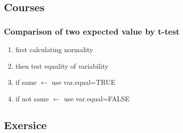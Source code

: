 \subsection{Courses}
\lstset{language=R}

\subsubsection{Comparison of two expected value by t-test}
\begin{enumerate}
    \item first calculating normality
    \item then test equality of variability
    \item if same $\leftarrow$ use var.equal=TRUE
    \item if not same $\leftarrow$ use var.equal=FALSE
\end{enumerate}

\subsection{Exersice}

